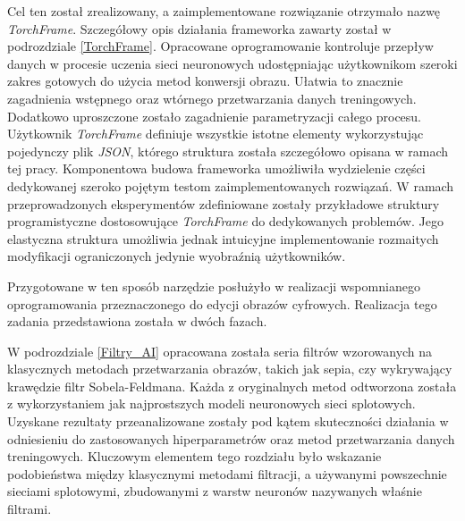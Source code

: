 \documentclass[10pt, a4paper, twoside, notitlepage, openright]{article}
\begin{document}
  Cel ten został zrealizowany, a zaimplementowane rozwiązanie otrzymało nazwę
  \textit{TorchFrame}. Szczegółowy opis działania frameworka zawarty został w
  podrozdziale \ref{TorchFrame}. Opracowane oprogramowanie kontroluje przepływ danych
  w procesie uczenia sieci neuronowych udostępniając użytkownikom szeroki zakres gotowych do
  użycia metod konwersji obrazu. Ułatwia to znacznie zagadnienia
  wstępnego oraz wtórnego przetwarzania danych treningowych. Dodatkowo uproszczone
  zostało zagadnienie parametryzacji całego procesu. Użytkownik \textit{TorchFrame}
  definiuje wszystkie istotne elementy wykorzystując pojedynczy plik \textit{JSON}, którego
  struktura została szczegółowo opisana w ramach tej pracy. Komponentowa budowa
  frameworka umożliwiła wydzielenie części dedykowanej szeroko pojętym testom
  zaimplementowanych rozwiązań. W ramach przeprowadzonych eksperymentów zdefiniowane
  zostały przykładowe struktury programistyczne dostosowujące \textit{TorchFrame}
  do dedykowanych problemów. Jego elastyczna struktura umożliwia jednak
  intuicyjne implementowanie rozmaitych modyfikacji ograniczonych jedynie
  wyobraźnią użytkowników.

  Przygotowane w ten sposób narzędzie posłużyło w realizacji wspomnianego oprogramowania
  przeznaczonego do edycji obrazów cyfrowych. Realizacja tego zadania przedstawiona
  została w dwóch fazach.

  W podrozdziale \ref{Filtry_AI} opracowana została seria filtrów wzorowanych na
  klasycznych metodach przetwarzania obrazów, takich jak sepia, czy wykrywający
  krawędzie filtr Sobela-Feldmana. Każda z oryginalnych metod odtworzona
  została z wykorzystaniem jak najprostszych modeli neuronowych sieci splotowych.
  Uzyskane rezultaty przeanalizowane zostały pod kątem skuteczności działania
  w odniesieniu do zastosowanych hiperparametrów oraz metod przetwarzania danych
  treningowych. Kluczowym elementem tego rozdziału było wskazanie podobieństwa
  między klasycznymi metodami filtracji, a używanymi powszechnie sieciami
  splotowymi, zbudowanymi z warstw neuronów nazywanych właśnie filtrami.
\end{document}
